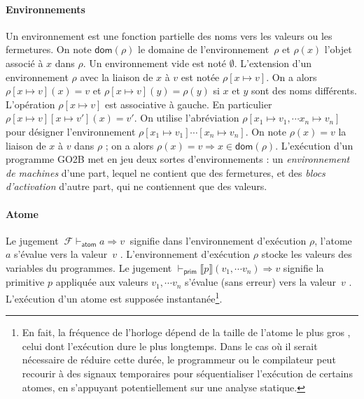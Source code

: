 \documentclass[11pt]{article}
\newcommand{\sem}[1]{\llbracket #1\rrbracket}
\newcommand{\envExtend}[3]{#1[#2 \mapsto #3]}
\newcommand{\bigStep}[4]{#1 \vdash_{\textsf{#2}} #3 \Rightarrow #4}
\newcommand{\GTBsemAtom}[3]{\bigStep{#1}{atom}{#2}{#3}}
\newcommand{\GTBsemPrim}[2]{\bigStep{}{prim}{#1}{#2}}
\begin{document}
\paragraph{Environnements}
Un environnement est une fonction partielle des noms vers les valeurs 
ou les fermetures. On note $\textsf{dom}(\rho)$ le domaine de 
l'environnement~$\rho$ et $\rho(x)$ l'objet associé à $x$ dans $\rho$. 
Un environnement vide est noté $\emptyset$. L'extension d'un environnement 
$\rho$ avec la liaison de $x$ à $v$ est notée $\envExtend{\rho}{x}{v}$. 
On a alors $\rho[x \mapsto v](x) = v$ et $\rho[x \mapsto v](y) = \rho(y)$
si $x$ et $y$ sont des noms différents. L'opération $\rho[x \mapsto v]$ 
est associative à gauche. En particulier $\rho[x \mapsto v][x \mapsto v'](x) = v'$.
On utilise l'abréviation $\rho[x_1 \mapsto v_1, \cdots x_n \mapsto v_n]$
pour désigner l'environnement $\rho[x_1 \mapsto v_1] \cdots [x_n \mapsto v_n]$. 
On note $\rho(x) = v$ la liaison de $x$ à $v$ dans $\rho$ ; on a alors 
$\rho(x) = v \Rightarrow x \in \textsf{dom}(\rho)$. L'exécution d'un
programme \textsf{GO2B} met en jeu deux sortes d'environnements :
un \emph{environnement de machines} d'une part, lequel ne contient
que des fermetures, et des \emph{blocs d'activation} d'autre part, 
qui ne contiennent que des valeurs.

\paragraph{Atome}
Le jugement $~\GTBsemAtom{\mathcal{F}}{a}{v}~$ signifie 
\og dans l'environnement d'exécution $\rho$, l'atome $a$ 
s'évalue vers la valeur~$v$ \fg. L'environnement d'exécution $\rho$ 
stocke les valeurs des variables du programmes. Le jugement 
$\vdash_\textsf{prim}\sem{p}(v_1,\cdots v_n) \Rightarrow v$ signifie \og 
la primitive $p$ appliquée aux valeurs $v_1,\cdots v_n$ s'évalue 
(sans erreur) vers la valeur~$v$ \fg. L'exécution d'un atome est 
supposée instantanée\footnote{En fait, la fréquence de l'horloge 
dépend de la taille de l'atome le plus \og gros \fg, celui dont 
l'exécution dure le plus longtemps. Dans le cas où il serait 
nécessaire de réduire cette durée, le programmeur ou le compilateur
 peut recourir à des signaux temporaires pour séquentialiser 
 l'exécution de certains atomes, en s'appuyant potentiellement
  sur une analyse statique.}.
\end{document}
